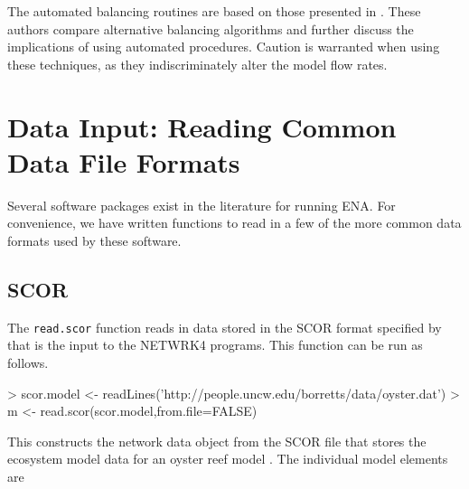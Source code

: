 \documentclass[article]{jss}
\begin{document}
The automated balancing routines are based on those presented in
\citet{allesina03}.  These authors compare alternative balancing
algorithms and further discuss the implications of using automated
procedures.  Caution is warranted when using these techniques, as they
indiscriminately alter the model flow rates.

\section{Data Input: Reading Common Data File Formats}
Several software packages exist in the literature for running ENA.  For
convenience, we have written functions to read in a few of the more
common data formats used by these software.

\subsection*{SCOR}
The \texttt{read.scor} function reads in data stored in the SCOR
format specified by \citet{ulanowicz91} that is the input to the
NETWRK4 programs.  This function can be run as follows.

\begin{Schunk}
\begin{Sinput}
> scor.model <- readLines('http://people.uncw.edu/borretts/data/oyster.dat')
> m <- read.scor(scor.model,from.file=FALSE)
\end{Sinput}
\end{Schunk}

This constructs the network data object from the SCOR file that stores
the ecosystem model data for an oyster reef model \citep{dame81}.  The
individual model elements are
\end{document}
